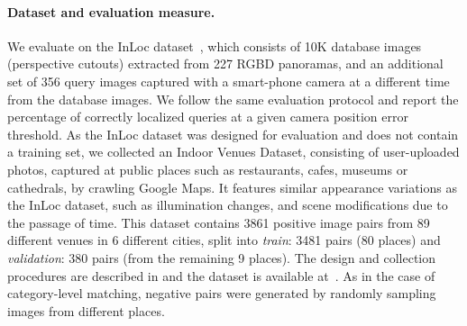 \documentclass{article}
\begin{document}
\paragraph{Dataset and evaluation measure.}
We evaluate on the InLoc dataset~\cite{Taira18},
which consists of 10K database images (perspective cutouts) extracted from 227 RGBD panoramas, and an additional set of 356 query images captured with a smart-phone camera at a different time from the database images. We follow the same evaluation protocol and report the percentage of correctly localized queries at a given camera position error threshold. As the InLoc dataset was designed for evaluation and does not contain a training set, we collected an Indoor Venues Dataset, consisting of user-uploaded photos, captured at public places such as restaurants, cafes, museums or cathedrals, by crawling Google Maps. It features similar appearance variations as the InLoc dataset, such as illumination changes, and scene modifications due to the passage of time. This dataset contains 3861 positive image pairs from 89 different venues in 6 different cities, split into \emph{train}: 3481 pairs (80 places) and \emph{validation}: 380 pairs (from the remaining 9 places). The design and collection procedures are described in  and the dataset is available at~\cite{website}. As in the case of category-level matching, negative pairs were generated by randomly sampling images from different places.
\end{document}
